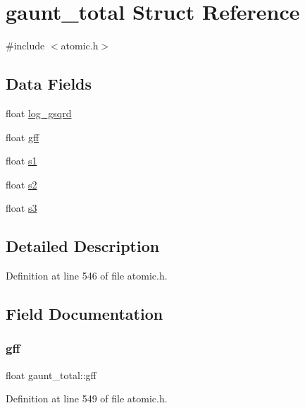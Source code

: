 \hypertarget{structgaunt__total}{}\section{gaunt\+\_\+total Struct Reference}
\label{structgaunt__total}


{\ttfamily \#include $<$atomic.\+h$>$}

\subsection*{Data Fields}
\begin{DoxyCompactItemize}
\item 
float \hyperlink{structgaunt__total_afab87d92003ffff52de20562aa3a5ecc}{log\+\_\+gsqrd}
\item 
float \hyperlink{structgaunt__total_a261bd3685d1f4a57e169c57ada13ef94}{gff}
\item 
float \hyperlink{structgaunt__total_a4274528ef519b394457a079752e7eacf}{s1}
\item 
float \hyperlink{structgaunt__total_aeb82d15d5958653015fb73bbde7f4a5d}{s2}
\item 
float \hyperlink{structgaunt__total_acfc24e1b011a5c27e689f0b285e39ff1}{s3}
\end{DoxyCompactItemize}


\subsection{Detailed Description}


Definition at line 546 of file atomic.\+h.



\subsection{Field Documentation}
\mbox{\label{structgaunt__total_a261bd3685d1f4a57e169c57ada13ef94}} 
\subsubsection{\texorpdfstring{gff}{gff}}
{\footnotesize\ttfamily float gaunt\+\_\+total\+::gff}



Definition at line 549 of file atomic.\+h.

